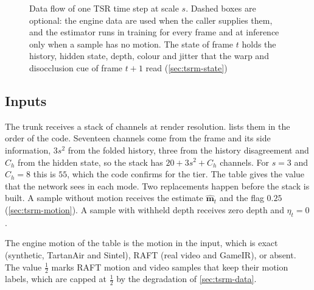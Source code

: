 \begin{figure}[!htbp]
\caption{Data flow of one TSR time step at scale $s$. Dashed boxes are optional: the engine data are used when the caller supplies them, and the estimator runs in training for every frame and at inference only when a sample has no motion. The state of frame $t$ holds the history, hidden state, depth, colour and jitter that the warp and disocclusion cue of frame $t+1$ read (\cref{sec:tsrm-state})}\label{fig:tsrm-arch}
\end{figure}

\FloatBarrier

\subsection{Inputs}\label{sec:tsrm-inputs}

The trunk receives a stack of channels at render resolution.  lists them in the order of the code. Seventeen channels come from the frame and its side information, $3s^2$ from the folded history, three from the history disagreement and $C_h$ from the hidden state, so the stack has $20+3s^2+C_h$ channels. For $s=3$ and $C_h=8$ this is $55$, which the code confirms for the  tier. The table gives the value that the network sees in each mode. Two replacements happen before the stack is built. A sample without motion receives the estimate $\hat{\mathbf{m}}_t$ and the flag $0.25$ (\cref{sec:tsrm-motion}). A sample with withheld depth receives zero depth and $\eta_t=0$.

The engine motion of the table is the motion in the input, which is exact (synthetic, TartanAir and Sintel), RAFT (real video and GameIR), or absent. The value $\tfrac12$ marks RAFT motion and video samples that keep their motion labels, which are capped at $\tfrac12$ by the degradation of \cref{sec:tsrm-data}.

